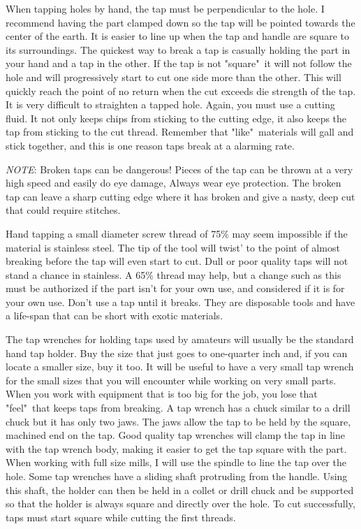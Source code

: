 
When tapping holes by hand, the tap must be perpendicular to the hole. I
recommend having the part clamped down so the tap will be pointed towards the
center of the earth. It is easier to line up when the tap and handle are square
to its surroundings. The quickest way to break a tap is casually holding the
part in your hand and a tap in the other. If the tap is not "square"\ it will
not follow the hole and will progressively start to cut one side more than the
other. This will quickly reach the point of no return when the cut exceeds die
strength of the tap. It is very difficult to straighten a tapped hole. Again,
you must use a cutting fluid. It not only keeps chips from sticking to the
cutting edge, it also keeps the tap from sticking to the cut thread. Remember
that "like"\ materials will gall and stick together, and this is one reason taps
break at a alarming rate.

\emph{NOTE}: Broken taps can be dangerous! Pieces of the tap can be thrown at a
very high speed and easily do eye damage, Always wear eye protection. The broken
tap can leave a sharp cutting edge where it has broken and give a nasty, deep
cut that could require stitches.


Hand tapping a small diameter screw thread of 75\% may seem impossible if the
material is stainless steel. The tip of the tool will twist' to the point of
almost breaking before the tap will even start to cut. Dull or poor quality taps
will not stand a chance in stainless. A 65\% thread may help, but a change such
as this must be authorized if the part isn't for your own use, and considered if
it is for your own use. Don't use a tap until it breaks. They are disposable
tools and have a life-span that can be short with exotic materials.


The tap wrenches for holding taps used by amateurs will usually be the standard
hand tap holder. Buy the size that just goes to one-quarter inch and, if you can
locate a smaller size, buy it too. It will be useful to have a very small tap
wrench for the small sizes that you will encounter while working on very small
parts. When you work with equipment that is too big for the job, you lose that
"feel"\ that keeps taps from breaking. A tap wrench has a chuck similar to a
drill chuck but it has only two jaws. The jaws allow the tap to be held by the
square, machined end on the tap. Good quality tap wrenches will clamp the tap in
line with the tap wrench body, making it easier to get the tap square with the
part. When working with full size mills, I will use the spindle to line the tap
over the hole. Some tap wrenches have a sliding shaft protruding from the
handle. Using this shaft, the holder can then be held in a collet or drill chuck
and be supported so that the holder is always square and directly over the hole.
To cut successfully, taps must start square while cutting the first threads.

